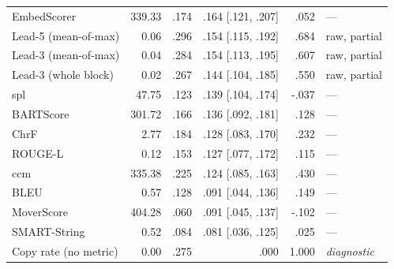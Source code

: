\begin{table}[t]
\begin{tabular}{@{}lrrrrl@{}}
EmbedScorer & 339.33 & .174 & .164 {\scriptsize [.121, .207]} & .052 & --- \\
Lead-5 (mean-of-max) & 0.06 & .296 & .154 {\scriptsize [.115, .192]} & .684 & raw, partial \\
Lead-3 (mean-of-max) & 0.04 & .284 & .154 {\scriptsize [.113, .195]} & .607 & raw, partial \\
Lead-3 (whole block) & 0.02 & .267 & .144 {\scriptsize [.104, .185]} & .550 & raw, partial \\
spl & 47.75 & .123 & .139 {\scriptsize [.104, .174]} & -.037 & --- \\
BARTScore & 301.72 & .166 & .136 {\scriptsize [.092, .181]} & .128 & --- \\
ChrF & 2.77 & .184 & .128 {\scriptsize [.083, .170]} & .232 & --- \\
ROUGE-L & 0.12 & .153 & .127 {\scriptsize [.077, .172]} & .115 & --- \\
ccm & 335.38 & .225 & .124 {\scriptsize [.085, .163]} & .430 & --- \\
BLEU & 0.57 & .128 & .091 {\scriptsize [.044, .136]} & .149 & --- \\
MoverScore & 404.28 & .060 & .091 {\scriptsize [.045, .137]} & -.102 & --- \\
SMART-String & 0.52 & .084 & .081 {\scriptsize [.036, .125]} & .025 & --- \\
\midrule
Copy rate (no metric) & 0.00 & .275 & .000 & 1.000 & \emph{diagnostic} \\
\bottomrule
\end{tabular}
\end{table}
